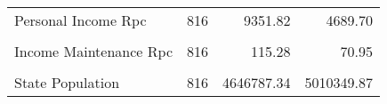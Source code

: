\begin{table}[H]
\begin{tabular}[t]{lrrr}
Personal Income Rpc & 816 & 9351.82 & 4689.70\\
\addlinespace
\cellcolor{gray!6}{Unemployment Insurance Rpc} & \cellcolor{gray!6}{816} & \cellcolor{gray!6}{50.02} & \cellcolor{gray!6}{38.08}\\
Income Maintenance Rpc & 816 & 115.28 & 70.95\\
\cellcolor{gray!6}{Retirement Payments Rpc} & \cellcolor{gray!6}{816} & \cellcolor{gray!6}{1002.23} & \cellcolor{gray!6}{546.47}\\
State Population & 816 & 4646787.34 & 5010349.87\\
\bottomrule
\end{tabular}
\end{table}
